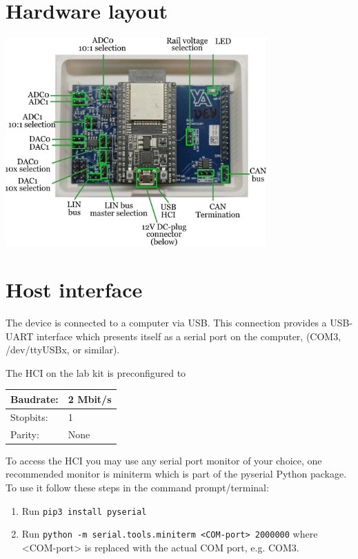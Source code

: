 \documentclass{article}[a4paper]
\begin{document}
\section{Hardware layout}

\begin{center}
\includegraphics[width=10cm]{lab-pcb-connections.png}
\end{center}

\section{Host interface}

The device is connected to a computer via USB. This connection provides a
USB-UART interface which presents itself as a serial port on the computer,
(COM3, /dev/ttyUSBx, or similar).

The HCI on the lab kit is preconfigured to

\medskip
\noindent
\begin{tabularx}{\textwidth}{|p{3cm}|X|}
\hline
Baudrate: & 2 Mbit/s \\
\hline
Stopbits: & 1 \\
\hline
Parity: & None \\
\hline
\end{tabularx}

To access the HCI you may use any serial port monitor of your choice, one
recommended monitor is miniterm which is part of the pyserial Python package. To
use it follow these steps in the command prompt/terminal:

\begin{enumerate}
\item Run \texttt{pip3 install pyserial}
\item Run \texttt{python -m serial.tools.miniterm <COM-port> 2000000} where
      <COM-port> is replaced with the actual COM port, e.g. COM3.
\end{enumerate}
\end{document}
